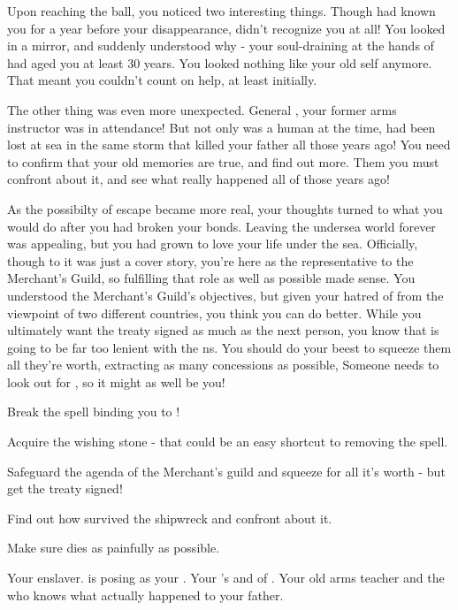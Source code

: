 \documentclass[char]{NeptuneBall}
\begin{document}
Upon reaching the ball, you noticed two interesting things. Though \cAriel{} had known you for a year before your disappearance, \cAriel{\they} didn't recognize you at all! You looked in a mirror, and suddenly understood why - your soul-draining at the hands of \cWitch{} had aged you at least 30 years. You looked nothing like your old self anymore. That meant you couldn't count on \cAriel{\their} help, at least initially.

The other thing was even more unexpected. General \cGeneral{}, your former arms instructor was in attendance! But not only was \cGeneral{\they} a human at the time, \cGeneral{\they} had been lost at sea in the same storm that killed your father all those years ago! You need to confirm that your old memories are true, and find out more. Them you must confront \cGeneral{\them} about it, and see what really happened all of those years ago!

As the possibilty of escape became more real, your thoughts turned to what you would do after you had broken your bonds. Leaving the undersea world forever was appealing, but you had grown to love your life under the sea. Officially, though to \cWitch{} it was just a cover story, you're here as the representative to the Merchant's Guild, so fulfilling that role as well as possible made sense. You understood the Merchant's Guild's objectives, but given your hatred of \pPacifica{} from the viewpoint of two different countries, you think you can do better. While you ultimately want the treaty signed as much as the next person, you know that \cKing{\King} \cKing{} is going to be far too lenient with the \pPacifica{}ns. You should do your beest to squeeze them all they're worth, extracting as many concessions as possible, Someone needs to look out for \pAtlantis{}, so it might as well be you!

\begin{itemz}[Goals]
	\item Break the spell binding you to \cWitch{}!
	\item Acquire the wishing stone - that could be an easy shortcut to removing the spell.
  \item Safeguard the agenda of the Merchant's guild and squeeze \pPacifica{} for all it's worth - but get the treaty signed!
	\item Find out how \cGeneral{} survived the shipwreck and confront \cGeneral{\them} about it.
	\item Make sure \cWitch{} dies as painfully as possible.
\end{itemz}

\begin{contacts}
  \contact{\cWitch{}} Your enslaver. \cWitch{\They} is posing as your \cWitch{\spouse}.
  \contact{\cAriel{}} Your \cEric{\sibling}'s \cAriel{\spouse} and \cAriel{\King} of \pAmerica{}.
  \contact{\cGeneral{}} Your old arms teacher and the \cGeneral{\mer} who knows what actually happened to your father.
\end{contacts}
\end{document}
